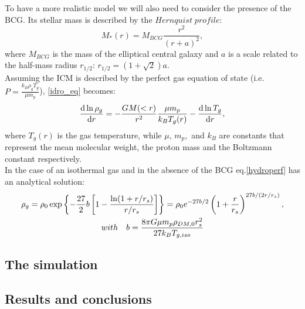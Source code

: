 \documentclass[]{article}
\begin{document}
To have a more realistic model we will also need to consider the presence of the BCG. Its stellar mass is described by the $Hernquist\; profile$:
\begin{equation}\label{Hern}
	M_{*}(r)=M_{BCG}\frac{r^{2}}{(r+a)^{2}},
\end{equation}
where $M_{BCG}$ is the mass of the elliptical central galaxy and $a$ is a scale related to the half-mass radius $r_{1/2}$: $r_{1/2}=(1+\sqrt{2})a$.\\
Assuming the ICM is described by the perfect gas equation of state (i.e. $P=\frac{k_{B}\rho_{g}T_{g}}{\mu m_{p}}$), \eqref{idro_eq} becomes:
\begin{equation}\label{hydroperf}
	\derivative{\ln \rho_{g}}{r}=-\frac{GM(<r)}{r^{2}}\frac{\mu m_{p}}{k_{B}T_{g}(r)}-\derivative{\ln T_{g}}{r},
\end{equation}
where $T_{g}(r)$ is the gas temperature, while $\mu ,\, m_{p},$ and $k_{B}$ are constants that represent the mean molecular weight, the proton mass and the Boltzmann constant respectively.\\
In the case of an isothermal gas and in the absence of the BCG eq.\eqref{hydroperf} has an analytical solution:
	\begin{gather}
		\rho_{g}=\rho_{0}\exp\left\{-\frac{27}{2}b\left[1-\frac{\ln (1+r/r_{s})}{r/r_{s}}\right]\right\}=\rho_{0}e^{-27b/2}\left(1+\frac{r}{r_{s}}\right)^{27b/(2r/r_{s})},\\
	with \quad b=\frac{8\pi G\mu m_{p}\rho_{DM,0}r_{s}^{2}}{27k_{B}T_{g,iso}}\notag
	\end{gather}
\subsection{The simulation}
\subsection{Results and conclusions}
\end{document}
